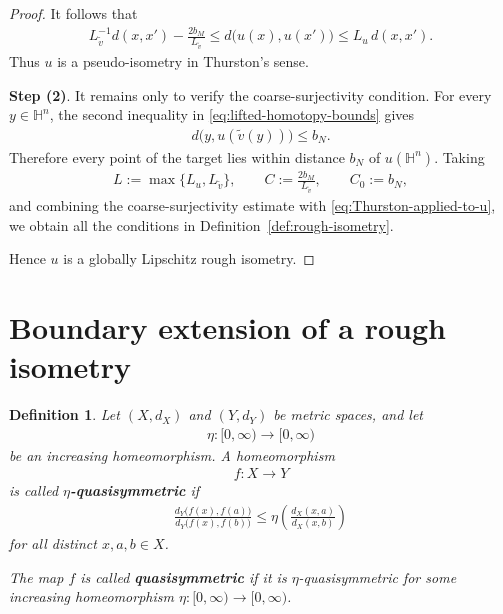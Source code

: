 \documentclass[11pt]{amsart}
\newcommand{\SuggestedDelete}[1]{{\hypersetup{linkcolor=red,citecolor=red,urlcolor=red}\color{red}#1}}
\newcommand{\SuggestedAdd}[1]{{\hypersetup{linkcolor=reviewgreen,citecolor=reviewgreen,urlcolor=reviewgreen}\color{reviewgreen}#1}}
\newcommand{\ReviewUnusedLabel}[1]{%
  \par\noindent
  \SuggestedDelete{\textup{\scriptsize Unused label: \texttt{\detokenize{\label{#1}}}}}%
  \par}
\newcommand{\ReviewLabelChange}[2]{%
  \par\noindent
  \SuggestedDelete{\textup{\scriptsize \texttt{\detokenize{\label{#1}}}}}%
  \quad
  \SuggestedAdd{\textup{\scriptsize \texttt{\detokenize{\label{#2}}}}}%
  \par}
\theoremstyle{plain}
\theoremstyle{plain}
\newtheorem{definition}[theorem]{Definition}
\theoremstyle{plain}
\numberwithin{equation}{section}
\begin{document}
\begin{proof}
It follows that
\begin{align}
L_{\widetilde v}^{-1}d(x,x')-\frac{2b_M}{L_{\widetilde v}}
\leq d\bigl(u(x),u(x')\bigr)
\leq L_u\,d(x,x').
\label{eq:Thurston-applied-to-u}
\end{align}
Thus \(u\) is a pseudo-isometry in Thurston's sense.

\textbf{Step (2)}. It remains only to verify the coarse-surjectivity condition. For every \(y\in\mathbb H^n\),
the second inequality in \eqref{eq:lifted-homotopy-bounds} gives
\begin{align}
d\bigl(y,u(\widetilde v(y))\bigr)\leq b_N.
\nonumber
\end{align}
Therefore every point of the target lies within distance \(b_N\) of
\(u(\mathbb H^n)\).  
Taking
\begin{align}
L:=\max\{L_u,L_{\widetilde v}\},
\qquad
C:=\frac{2b_M}{L_{\widetilde v}},
\qquad
C_0:=b_N,
\nonumber
\end{align}
and combining the coarse-surjectivity estimate with
\eqref{eq:Thurston-applied-to-u}, we obtain all the conditions in
Definition~\ref{def:rough-isometry}.

Hence \(u\) is a globally Lipschitz rough isometry.
\end{proof}

\section{Boundary extension of a rough isometry}

\begin{definition}\label{def:quasisymmetry}
Let \((X,d_X)\) and \((Y,d_Y)\) be metric spaces, and let
\begin{align}
\eta:[0,\infty)\longrightarrow[0,\infty)
\nonumber
\end{align}
be an increasing homeomorphism. A homeomorphism
\begin{align}
f:X\longrightarrow Y
\nonumber
\end{align}
is called \textbf{\(\eta\)-quasisymmetric} if
\begin{align}
\frac{d_Y\bigl(f(x),f(a)\bigr)}
     {d_Y\bigl(f(x),f(b)\bigr)}
\leq
\eta\!\left(
\frac{d_X(x,a)}{d_X(x,b)}
\right)
\label{eq:metric-quasisymmetry}
\end{align}
for all distinct \(x,a,b\in X\).

The map \(f\) is called \textbf{quasisymmetric} if it is
\(\eta\)-quasisymmetric for some increasing homeomorphism
\(\eta:[0,\infty)\to[0,\infty)\).
\end{definition}
\end{document}
